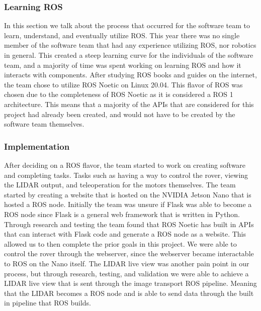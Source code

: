 \documentclass[a4paper, 10pt]{article}
\begin{document}
    \subsubsection*{Learning ROS}
    In this section we talk about the process that occurred for the software team to learn, understand, and eventually utilize ROS. This year there was no single member of the software team that had any experience utilizing ROS, nor robotics in general. This created a steep learning curve for the individuals of the software team, and a majority of time was spent working on learning ROS and how it interacts with components. After studying ROS books and guides on the internet, the team chose to utilize ROS Noetic on Linux 20.04. This flavor of ROS was chosen due to the completeness of ROS Noetic as it is considered a ROS 1 architecture. This means that a majority of the APIs that are considered for this project had already been created, and would not have to be created by the software team themselves. 

    \subsubsection*{Implementation}
    After deciding on a ROS flavor, the team started to work on creating software and completing tasks. Tasks such as having a way to control the rover, viewing the LIDAR output, and teleoperation for the motors themselves. The team started by creating a website that is hosted on the NVIDIA Jetson Nano that is hosted a ROS node. Initially the team was unsure if Flask was able to become a ROS node since Flask is a general web framework that is written in Python. Through research and testing the team found that ROS Noetic has built in APIs that can interact with Flask code and generate a ROS node as a website. This allowed us to then complete the prior goals in this project. We were able to control the rover through the webserver, since the webserver became interactable to ROS on the Nano itself. The LIDAR live view was another pain point in our process, but through research, testing, and validation we were able to achieve a LIDAR live view that is sent through the image transport ROS pipeline. Meaning that the LIDAR becomes a ROS node and is able to send data through the built in pipeline that ROS builds. 
\end{document}
